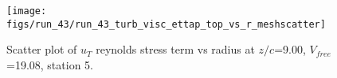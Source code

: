 \begin{figure}[H]
\centering
\texttt{[image: figs/run\_43/run\_43\_turb\_visc\_ettap\_top\_vs\_r\_meshscatter]}
\caption{Scatter plot of $
u_T$ reynolds stress term vs radius at $z/c$=9.00, $V_{free}$=19.08, station 5.}
\label{fig:run_43_turb_visc_ettap_top_vs_r_meshscatter}
\end{figure}


